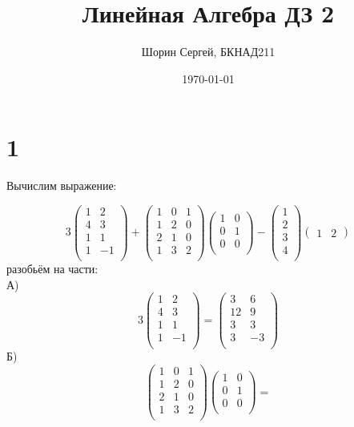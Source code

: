 \documentclass[a4paper]{article}
\author{Шорин Сергей, БКНАД211}
\title{Линейная Алгебра ДЗ 2}
\date{\today}
\begin{document}
\maketitle

\newpage

\section*{1}
Вычислим выражение:

\begin{equation*}
3
\begin{pmatrix}
1 &2\\
4&3\\
1&1\\
1&-1\\
\end{pmatrix} +
\begin{pmatrix}
  1&0&1\\
1&2&0\\
2&1&0\\
1&3&2\\
\end{pmatrix}
\begin{pmatrix}
 1&0\\
0&1\\
0&0\\
\end{pmatrix}
-
\begin{pmatrix}
 1\\
2\\
3\\
4\\
\end{pmatrix}
\begin{pmatrix}
1&2
\end{pmatrix}
\end{equation*}
разобьём на части: \\
А)
\begin{equation*}
3
\begin{pmatrix}
1 &2\\
4&3\\
1&1\\
1&-1\\
\end{pmatrix}  = 
\begin{pmatrix}
3 &6\\
12&9\\
3&3\\
3&-3\\
\end{pmatrix}
\end{equation*}
Б)
\begin{equation*}
\begin{pmatrix}
  1&0&1\\
1&2&0\\
2&1&0\\
1&3&2\\
\end{pmatrix}
\begin{pmatrix}
 1&0\\
0&1\\
0&0\\
\end{pmatrix} =
\end{equation*} 
\end{document}
